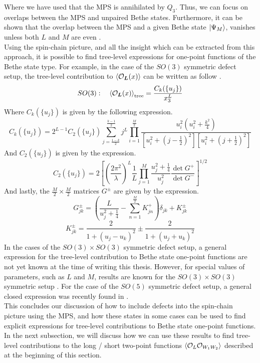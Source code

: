 %
%
Where we have used that the MPS is annihilated by $Q_3$. Thus, we can focus on overlaps between the MPS and unpaired Bethe states. Furthermore, it can be shown that the overlap between the MPS and a given Bethe state $\ket{\Psi_M}$, vanishes unless both $L$ and $M$ are even \cite{MPS bethe state overlap}.\\
Using the spin-chain picture, and all the insight which can be extracted from this approach, it is possible to find tree-level expressions for one-point functions of the Bethe state type. For example, in the case of the $SO(3)$ symmetric defect setup, the tree-level contribution to $\expval{\mathcal{O}_{\boldsymbol{L}}(x)}$ can be written as follow \cite{MPS bethe state overlap, non-protected one-point functions}.
%
%
\begin{equation}
SO(3) : \quad
%
\expval{\mathcal{O}_{\boldsymbol{L}}(x)}_{\text{tree}}
=
\frac{C_k(\{ u_j \})}{x_3^L}
\end{equation}
%
%
Where $C_k(\{ u_j \})$ is given by the following expression.
%
%
\begin{equation}
C_k(\{ u_j \})
=
2^{L-1} C_2(\{ u_j \})
\sum_{j=\frac{1-k}{2}}^{\frac{k-1}{2}}
j^L
\prod_{i=1}^{\frac{M}{2}}
\frac{u_i^2 \left(u_i^2 + \frac{k^2}{4} \right)}
{\left[ u_i^2 + \left(j - \frac{1}{2} \right)^2 \right]
\left[ u_i^2 + \left(j + \frac{1}{2} \right)^2 \right]}
\end{equation}
%
%
And $C_2(\{ u_j \})$ is given by the expression.
%
%
\begin{equation}
C_2(\{ u_j \})
=
2 \left[
\left( \frac{2 \pi^2}{\lambda} \right)^L
\frac{1}{L}
\prod_{j=1}^M
\frac{u_j^2 + \frac{1}{4}}{u_j^2}
\frac{\det G^{+}}{\det G^{-}}
\right]^{1 / 2}
\end{equation}
%
%
And lastly, the $\frac{M}{2} \times \frac{M}{2}$ matrices $G^{\pm}$ are given by the expression.
%
%
\begin{equation}
G_{jk}^{\pm} 
=
\left(
\frac{L}{u_j^2 + \frac{1}{4}}
-
\sum_{n=1}^{\frac{M}{2}}
K_{jn}^{+}
\right)
\delta_{jk}
+
K_{jk}^{\pm}
\end{equation}
%
%
\begin{equation}
K_{jk}^{\pm}
=
\frac{2}{1 + (u_j - u_k)^2}
\pm
\frac{2}{1 + (u_j + u_k)^2}
\end{equation}
%
%
In the cases of the $SO(3) \times SO(3)$ symmetric defect setup, a general expression for the tree-level contribution to Bethe state one-point functions are not yet known at the time of writing this thesis. However, for special values of parameters, such as $L$ and $M$, results are known for the $SO(3) \times SO(3)$ symmetric setup \cite{Lack of integrability in SO(3)xSO(3)}. For the case of the $SO(5)$ symmetric defect setup, a general closed expression was recently found in \cite{Overlap SO(5) general formula}.\\
This concludes our discussion of how to include defects into the spin-chain picture using the MPS, and how these states in some cases can be used to find explicit expressions for tree-level contributions to Bethe state one-point functions. In the next subsection, we will discuss how we can use these results to find tree-level contributions to the long / short two-point functions $\expval{\mathcal{O}_L \mathcal{O}_{W_1 W_2}}$ described at the beginning of this section. 

